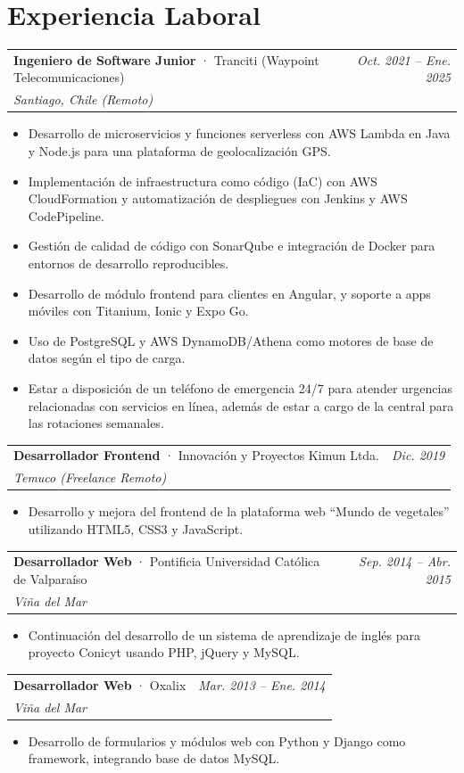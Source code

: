 \documentclass[a4paper,11pt]{article}
\makeatletter
\newcommand{\entrada}[4]{%
  \vspace{6pt}
  \begin{tabularx}{\textwidth}{@{}X r@{}}
    \textbf{#1} \textcolor{gris}{· #2} & \textcolor{grisCLaro}{\small\textit{#4}} \\
    \textcolor{grisCLaro}{\small\textit{#3}} & \\
  \end{tabularx}
  \vspace{2pt}
}
\makeatother
\begin{document}
\section{Experiencia Laboral}

\entrada{Ingeniero de Software Junior}{Tranciti (Waypoint Telecomunicaciones)}{Santiago, Chile (Remoto)}{Oct. 2021 -- Ene. 2025}
\begin{itemize}
  \item Desarrollo de microservicios y funciones serverless con AWS Lambda en Java y Node.js para una plataforma de geolocalización GPS.
  \item Implementación de infraestructura como código (IaC) con AWS CloudFormation y automatización de despliegues con Jenkins y AWS CodePipeline.
  \item Gestión de calidad de código con SonarQube e integración de Docker para entornos de desarrollo reproducibles.
  \item Desarrollo de módulo frontend para clientes en Angular, y soporte a apps móviles con Titanium, Ionic y Expo Go.
  \item Uso de PostgreSQL y AWS DynamoDB/Athena como motores de base de datos según el tipo de carga.
  \item Estar a disposición de un teléfono de emergencia 24/7 para atender urgencias relacionadas con servicios en línea, además de estar a cargo de la central para las rotaciones semanales.
\end{itemize}
  

\entrada{Desarrollador Frontend}{Innovación y Proyectos Kimun Ltda.}{Temuco (Freelance Remoto)}{Dic. 2019}
\begin{itemize}
  \item Desarrollo y mejora del frontend de la plataforma web ``Mundo de vegetales'' utilizando HTML5, CSS3 y JavaScript.
\end{itemize}

\entrada{Desarrollador Web}{Pontificia Universidad Católica de Valparaíso}{Viña del Mar}{Sep. 2014 -- Abr. 2015}
\begin{itemize}
  \item Continuación del desarrollo de un sistema de aprendizaje de inglés para proyecto Conicyt usando PHP, jQuery y MySQL.
\end{itemize}

\entrada{Desarrollador Web}{Oxalix}{Viña del Mar}{Mar. 2013 -- Ene. 2014}
\begin{itemize}
  \item Desarrollo de formularios y módulos web con Python y Django como framework, integrando base de datos MySQL.
\end{itemize}
\end{document}
